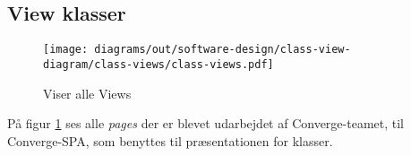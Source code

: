 \subsection{View klasser}


\begin{figure}[H]
    \centering
\texttt{[image: diagrams/out/software-design/class-view-diagram/class-views/class-views.pdf]}
\caption{Viser alle Views}
\label{fig:view}
\end{figure}

På figur \ref{fig:view} ses alle \emph{pages} der er blevet udarbejdet af Converge-teamet, til Converge-SPA, som benyttes til præsentationen for klasser. 